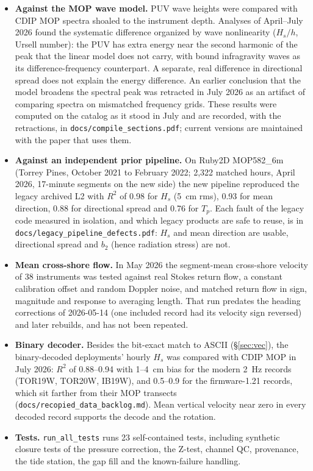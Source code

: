 \documentclass[11pt]{article}
\newcommand{\code}[1]{\texttt{#1}}
\begin{document}
\begin{itemize}
\item \textbf{Against the MOP wave model.} PUV wave heights were compared with CDIP MOP spectra
  shoaled to the instrument depth. Analyses of April--July 2026 found the systematic difference
  organized by wave nonlinearity ($H_s/h$, Ursell number): the PUV has extra energy near the
  second harmonic of the peak that the linear model does not carry, with bound infragravity
  waves as its difference-frequency counterpart. A separate, real difference in directional
  spread does not explain the energy difference. An earlier conclusion that the model broadens
  the spectral peak was retracted in July 2026 as an artifact of comparing spectra on mismatched
  frequency grids. These results were computed on the catalog as it stood in July and are
  recorded, with the retractions, in \code{docs/compile\_sections.pdf}; current versions are
  maintained with the paper that uses them.
\item \textbf{Against an independent prior pipeline.} On Ruby2D MOP582\_6m (Torrey Pines,
  October 2021 to February 2022; 2,322 matched hours, April 2026, 17-minute segments on the new
  side) the new pipeline reproduced the legacy archived L2 with $R^2$ of 0.98 for $H_s$
  (5~cm rms), 0.93 for mean direction, 0.88 for directional spread and 0.76 for $T_p$. Each fault
  of the legacy code measured in isolation, and which legacy products are safe to reuse, is in
  \code{docs/legacy\_pipeline\_defects.pdf}: $H_s$ and mean direction are usable, directional
  spread and $b_2$ (hence radiation stress) are not.
\item \textbf{Mean cross-shore flow.} In May 2026 the segment-mean cross-shore velocity of 38
  instruments was tested against real Stokes return flow, a constant calibration offset and
  random Doppler noise, and matched return flow in sign, magnitude and response to averaging
  length. That run predates the heading corrections of 2026-05-14 (one included record had its
  velocity sign reversed) and later rebuilds, and has not been repeated.
\item \textbf{Binary decoder.} Besides the bit-exact match to ASCII (\S\ref{sec:vec}), the
  binary-decoded deployments' hourly $H_s$ was compared with CDIP MOP in July 2026: $R^2$ of
  0.88--0.94 with 1--4~cm bias for the modern 2~Hz records (TOR19W, TOR20W, IB19W), and
  0.5--0.9 for the firmware-1.21 records, which sit farther from their MOP transects
  (\code{docs/recopied\_data\_backlog.md}). Mean vertical velocity near zero in every decoded
  record supports the decode and the rotation.
\item \textbf{Tests.} \code{run\_all\_tests} runs 23 self-contained tests, including synthetic
  closure tests of the pressure correction, the Z-test, channel QC, provenance, the tide station,
  the gap fill and the known-failure handling.
\end{itemize}
\end{document}
